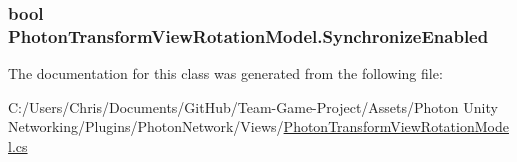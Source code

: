 \subsubsection[{\texorpdfstring{Synchronize\+Enabled}{SynchronizeEnabled}}]{\setlength{\rightskip}{0pt plus 5cm}bool Photon\+Transform\+View\+Rotation\+Model.\+Synchronize\+Enabled}\hypertarget{class_photon_transform_view_rotation_model_a36cdb8874f88d786106aa6def2c00c4d}{}\label{class_photon_transform_view_rotation_model_a36cdb8874f88d786106aa6def2c00c4d}


The documentation for this class was generated from the following file\+:\begin{DoxyCompactItemize}
\item 
C\+:/\+Users/\+Chris/\+Documents/\+Git\+Hub/\+Team-\/\+Game-\/\+Project/\+Assets/\+Photon Unity Networking/\+Plugins/\+Photon\+Network/\+Views/\hyperlink{_photon_transform_view_rotation_model_8cs}{Photon\+Transform\+View\+Rotation\+Model.\+cs}\end{DoxyCompactItemize}
